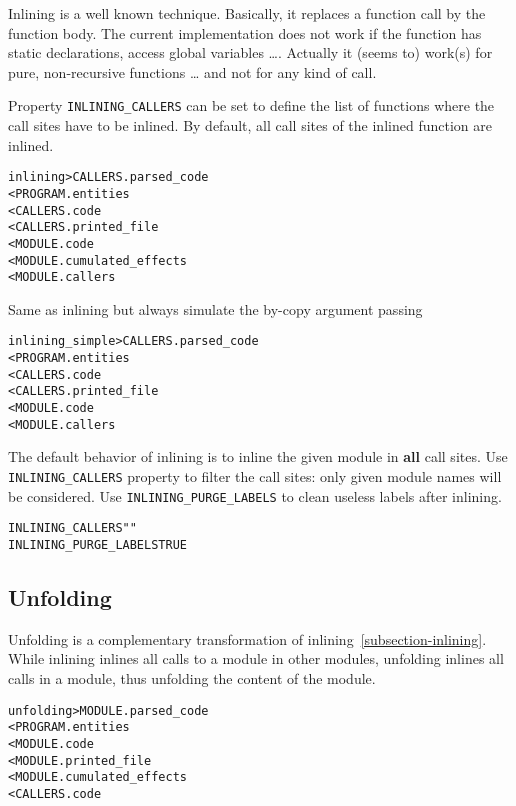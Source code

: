 \documentclass[a4paper]{report}
\newenvironment{PipsProp}{\begin{alltt}}{\end{alltt}}
\newenvironment{PipsMake}{\begin{alltt}}{\end{alltt}}
\begin{document}
Inlining is a well known technique.  Basically, it replaces a function
call by the function body. The current implementation does not work if
the function has static declarations, access global variables \dots.
Actually it (seems to) work(s) for pure, non-recursive functions \dots
and not for any kind of call. 

Property \lstinline|INLINING_CALLERS| can be set to define the list of
functions where the call sites have to be inlined. By default, all
call sites of the inlined function are inlined.
\begin{PipsMake}

inlining      > CALLERS.parsed_code
        < PROGRAM.entities
        < CALLERS.code
        < CALLERS.printed_file
		< MODULE.code
        < MODULE.cumulated_effects
        < MODULE.callers
\end{PipsMake}

Same as inlining but always simulate the by-copy argument passing
\begin{PipsMake}
inlining_simple      > CALLERS.parsed_code
        < PROGRAM.entities
        < CALLERS.code
        < CALLERS.printed_file
		< MODULE.code
        < MODULE.callers
\end{PipsMake}


The default behavior of inlining is to inline the given module in \textbf{all} call sites.
Use \lstinline|INLINING_CALLERS| property to filter the call sites: only given module names will be considered.
Use \lstinline|INLINING_PURGE_LABELS| to clean useless labels after inlining.
\begin{PipsProp}
INLINING_CALLERS ""
INLINING_PURGE_LABELS TRUE
\end{PipsProp}


\subsection{Unfolding}
\label{subsection-unfolding}

Unfolding is a complementary transformation of
inlining~\ref{subsection-inlining}.  While inlining inlines all calls to a
module in other modules, unfolding inlines all calls in a module, thus
unfolding the content of the module.
\begin{PipsMake}

unfolding      > MODULE.parsed_code
        < PROGRAM.entities
        < MODULE.code
        < MODULE.printed_file
        < MODULE.cumulated_effects
        < CALLERS.code
\end{PipsMake}
\end{document}
